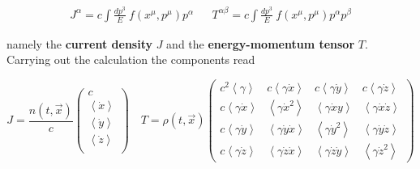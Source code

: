 \documentclass[11pt]{article}
\numberwithin{equation}{section}
\begin{document}
\begin{align}
J^{\alpha}= c \int \frac{dp^3}{E} \ f( x^{\mu}, p^{\mu}) p^{\alpha}  &&   T^{\alpha \beta}= c \int \frac{dp^3}{E} \ f( x^{\mu}, p^{\mu}) p^{\alpha}p^{\beta}  
\end{align}
 
namely the \textbf{current density} $J$ and the \textbf{energy-momentum tensor} $T$. Carrying out the calculation the components read 


\[
  J= \frac{n(t,\vec{x})}{c}
  \begin{pmatrix}
    c \\
    \left< \dot{x} \right> \\
    \left< \dot{y} \right> \\
    \left< \dot{z} \right> \\
  \end{pmatrix}\quad
  T= \rho(t,\vec{x})
  \begin{pmatrix}
    c^2 \left< \gamma \right> & c \left< \gamma \dot{x} \right> &  c \left< \gamma \dot{y} \right> & c \left< \gamma \dot{z} \right> \\
     c \left< \gamma \dot{x} \right> & \left< \gamma \dot{x}^2 \right> &  \left< \gamma \dot{x}y \right> &  \left< \gamma \dot{x} \dot{z} \right>  \\
     c \left< \gamma \dot{y} \right> &  \left< \gamma \dot{y} \dot{x} \right>&  \left< \gamma \dot{y}^2 \right> &  \left< \gamma \dot{y} \dot{z} \right>  \\
     c \left< \gamma \dot{z} \right> &  \left< \gamma \dot{z}\dot{x} \right>& \left< \gamma \dot{z}\dot{y} \right> &  \left< \gamma \dot{z}^2 \right> 
  \end{pmatrix}
\]
\end{document}
